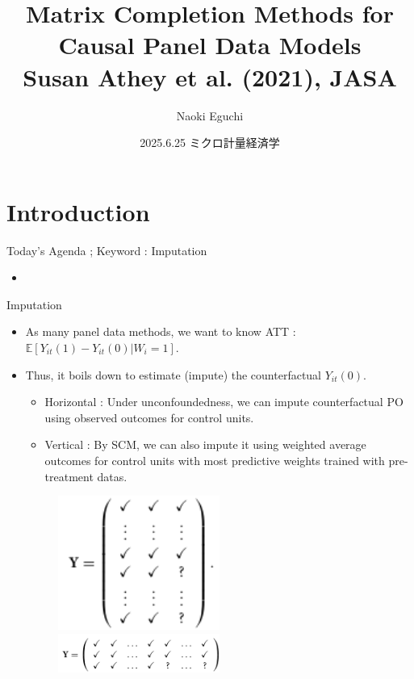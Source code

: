 \documentclass[xcolor=svgnames,aspectratio=169]{beamer}
\newcommand{\E}{\mathbb{E}}
\begin{document}
 

\title{Matrix Completion Methods for Causal Panel Data Models \\ \small{Susan Athey et al. (2021), JASA}}
\author{Naoki Eguchi}          
\date{2025.6.25 ミクロ計量経済学}

\begin{frame}                  
    \titlepage                     
\end{frame}

\section{Introduction}

\begin{frame}{Today's Agenda ; Keyword : Imputation}
    \begin{itemize}
        \item
    \end{itemize}
\end{frame}

\begin{frame}{Imputation}
    \begin{itemize}
        \item As many panel data methods, we want to know ATT : $\E[Y_{it}(1)-Y_{it}(0)|W_i=1]$.
        \item Thus, it boils down to estimate (impute) the counterfactual $Y_{it}(0)$.
        \begin{itemize}
            \item Horizontal : Under unconfoundedness, we can impute counterfactual PO using observed outcomes for control units.
            \item Vertical : By SCM, we can also impute it using weighted average outcomes for control units with most predictive weights trained with pre-treatment datas.
        \end{itemize}
        \begin{figure}
            \includegraphics[width=0.5\textwidth, height=0.4\textheight, keepaspectratio]{Horizontal.png} \ 
            \includegraphics[width=0.5\textwidth, height=0.5\textheight, keepaspectratio]{Vertical.png}
        \end{figure}
    \end{itemize}
\end{frame}
\end{document}

